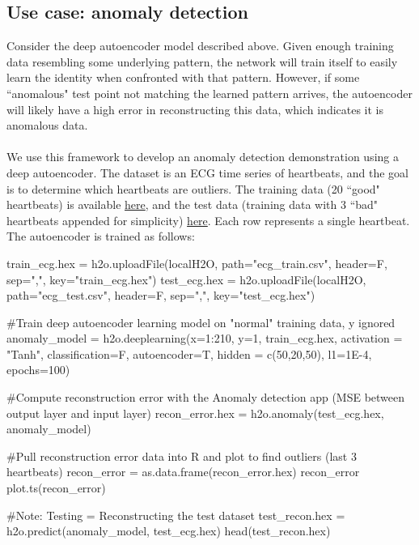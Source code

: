 \documentclass[12pt]{article}
\begin{document}
\subsection{Use case: anomaly detection}
Consider the deep autoencoder model described above. Given enough training data resembling some underlying pattern, the network will train itself to easily learn the identity when confronted with that pattern. However, if some ``anomalous" test point not matching the learned pattern arrives, the autoencoder will likely have a high error in reconstructing this data, which indicates it is anomalous data.
\\
\\
We use this framework to develop an anomaly detection demonstration using a deep autoencoder. The dataset is an ECG time series of heartbeats, and the goal is to determine which heartbeats are outliers. The training data (20 ``good" heartbeats) is available \href{https://raw.githubusercontent.com/0xdata/h2o/master/smalldata/anomaly/ecg_discord_train.csv}{here}, and the test data (training data with 3 ``bad" heartbeats appended for simplicity) \href{https://raw.githubusercontent.com/0xdata/h2o/master/smalldata/anomaly/ecg_discord_test.csv}{here}. Each row represents a single heartbeat. The autoencoder is trained as follows: 

\begin{spverbatim}

train_ecg.hex = h2o.uploadFile(localH2O, path="ecg_train.csv", header=F, sep=",", key="train_ecg.hex") 
test_ecg.hex = h2o.uploadFile(localH2O, path="ecg_test.csv", header=F, sep=",", key="test_ecg.hex") 

#Train deep autoencoder learning model on "normal" training data, y ignored 
anomaly_model = h2o.deeplearning(x=1:210, y=1, train_ecg.hex, activation = "Tanh", classification=F, autoencoder=T, hidden = c(50,20,50), l1=1E-4, 
epochs=100)                 
                              
#Compute reconstruction error with the Anomaly detection app (MSE between
output layer and input layer)
recon_error.hex = h2o.anomaly(test_ecg.hex, anomaly_model)
                              
#Pull reconstruction error data into R and plot to find outliers (last 3
heartbeats)
recon_error = as.data.frame(recon_error.hex)
recon_error
plot.ts(recon_error)

#Note: Testing = Reconstructing the test dataset
test_recon.hex = h2o.predict(anomaly_model, test_ecg.hex) 
head(test_recon.hex)              

\end{spverbatim}
\noindent
\end{document}
